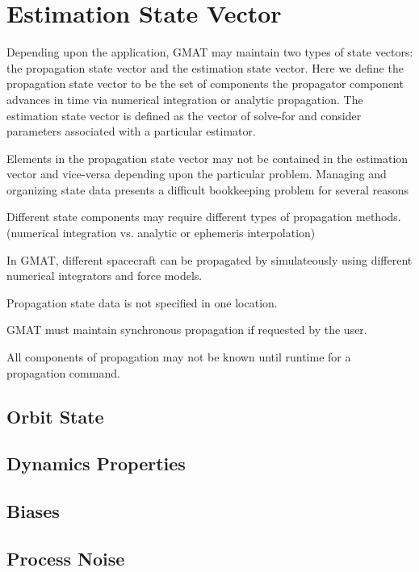 \section{Estimation State Vector}

Depending upon the application, GMAT may maintain  two types of
state vectors:  the propagation state vector and the estimation
state vector.  Here we define the propagation state vector to be the
set of components  the propagator component advances in time via
numerical integration or analytic propagation.  The estimation state
vector is defined as the vector of solve-for and consider parameters
associated with a particular estimator.

Elements in the propagation state vector may not be contained in the
estimation vector and vice-versa depending upon the particular
problem.  Managing and organizing state data presents a difficult
bookkeeping problem for several reasons

\begin{compactenum}
     \item Different state components may require different types of
     propagation methods.  (numerical integration vs. analytic
     or ephemeris interpolation)
     \item In GMAT, different spacecraft can be propagated by
     simulateously using different numerical integrators and
     force models.
     \item Propagation state data is not specified in one location.
     \item GMAT must maintain synchronous propagation if requested
     by the user.
     \item All components of propagation may not be known until
     runtime for a propagation command.
\end{compactenum}



\subsection{Orbit State}

\subsection{Dynamics Properties}

\subsection{Biases}

\subsection{Process Noise}
